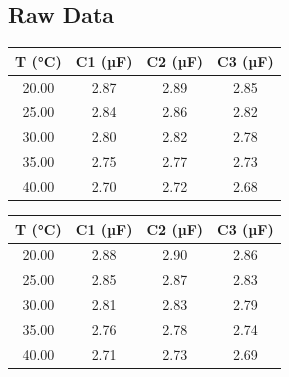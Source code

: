 \documentclass[12pt]{article}
\numberwithin{equation}{section}
\begin{document}
\subsection{Raw Data}
\vspace{0.5cm}
\FloatBarrier
\noindent
\begin{minipage}{0.5\textwidth}
    \centering
    \begin{tabular}{@{}cccc@{}}
    \toprule
    T (°C) & C1 (µF) & C2 (µF) & C3 (µF) \\ \midrule
    20.00               & 2.87             & 2.89             & 2.85             \\
    25.00               & 2.84             & 2.86             & 2.82             \\
    30.00               & 2.80             & 2.82             & 2.78             \\
    35.00               & 2.75             & 2.77             & 2.73             \\
    40.00               & 2.70             & 2.72             & 2.68             \\ \bottomrule
    \end{tabular}
\end{minipage}%
\begin{minipage}{0.5\textwidth}
    \centering
    \begin{tabular}{@{}cccc@{}}
    \toprule
    T (°C) & C1 (µF) & C2 (µF) & C3 (µF) \\ \midrule
    20.00               & 2.88             & 2.90             & 2.86             \\
    25.00               & 2.85             & 2.87             & 2.83             \\
    30.00               & 2.81             & 2.83             & 2.79             \\
    35.00               & 2.76             & 2.78             & 2.74             \\
    40.00               & 2.71             & 2.73             & 2.69             \\ \bottomrule
    \end{tabular}
\end{minipage}
\vspace{1cm}\\
\noindent
\end{document}
